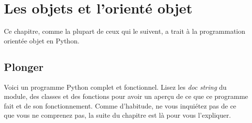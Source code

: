 \chapter{Les objets et l'orienté objet}

Ce chapitre, comme la plupart de ceux qui le suivent, a trait à la programmation orientée objet en Python.

\section{Plonger}

Voici un programme Python complet et fonctionnel. Lisez les \emph{doc string} du module, des classes et des fonctions pour avoir un aperçu de ce que ce programme fait et de son fonctionnement. Comme d'habitude, ne vous inquiétez pas de ce que vous ne comprenez pas, la suite du chapitre est là pour vous  l'expliquer.

